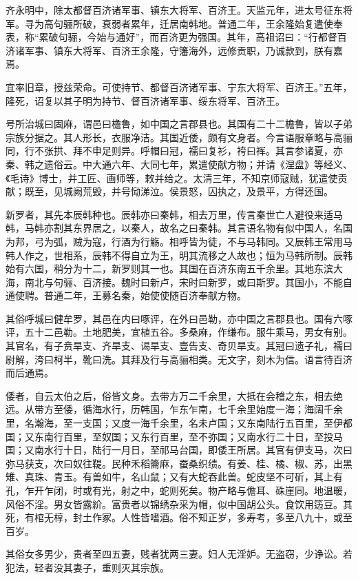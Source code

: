 \documentclass[12pt,UTF8]{ctexbook}
\begin{document}
齐永明中，除太都督百济诸军事、镇东大将军、百济王。天监元年，进太号征东将军。寻为高句骊所破，衰弱者累年，迁居南韩地。普通二年，王余隆始复遣使奉表，称“累破句骊，今始与通好”，而百济更为强国。其年，高祖诏曰：“行都督百济诸军事、镇东大将军、百济王余隆，守籓海外，远修贡职，乃诚款到，朕有嘉焉。

宜率旧章，授兹荣命。可使持节、都督百济诸军事、宁东大将军、百济王。”五年，隆死，诏复以其子明为持节、督百济诸军事、绥东将军、百济王。

号所治城曰固麻，谓邑曰檐鲁，如中国之言郡县也。其国有二十二檐鲁，皆以子弟宗族分据之。其人形长，衣服净洁。其国近倭，颇有文身者。今言语服章略与高骊同，行不张拱、拜不申足则异。呼帽曰冠，襦曰复衫，袴曰裈。其言参诸夏，亦秦、韩之遗俗云。中大通六年、大同七年，累遣使献方物；并请《涅盘》等经义、《毛诗》博士，并工匠、画师等，敕并给之。太清三年，不知京师寇贼，犹遣使贡献；既至，见城阙荒毁，并号恸涕泣。侯景怒，囚执之，及景平，方得还国。

新罗者，其先本辰韩种也。辰韩亦曰秦韩，相去万里，传言秦世亡人避役来适马韩，马韩亦割其东界居之，以秦人，故名之曰秦韩。其言语名物有似中国人，名国为邦，弓为弧，贼为寇，行酒为行觞。相呼皆为徒，不与马韩同。又辰韩王常用马韩人作之，世相系，辰韩不得自立为王，明其流移之人故也；恒为马韩所制。辰韩始有六国，稍分为十二，新罗则其一也。其国在百济东南五千余里。其地东滨大海，南北与句骊、百济接。魏时曰新卢，宋时曰新罗，或曰斯罗。其国小，不能自通使聘。普通二年，王募名秦，始使使随百济奉献方物。

其俗呼城曰健牟罗，其邑在内曰啄评，在外曰邑勒，亦中国之言郡县也。国有六啄评，五十二邑勒。土地肥美，宜植五谷。多桑麻，作缣布。服牛乘马，男女有别。其官名，有子贲旱支、齐旱支、谒旱支、壹告支、奇贝旱支。其冠曰遗子礼，襦曰尉解，洿曰柯半，靴曰洗。其拜及行与高骊相类。无文字，刻木为信。语言待百济而后通焉。

倭者，自云太伯之后，俗皆文身。去带方万二千余里，大抵在会稽之东，相去绝远。从带方至倭，循海水行，历韩国，乍东乍南，七千余里始度一海；海阔千余里，名瀚海，至一支国；又度一海千余里，名未卢国；又东南陆行五百里，至伊都国；又东南行百里，至奴国；又东行百里，至不弥国；又南水行二十日，至投马国；又南水行十日，陆行一月日，至祁马台国，即倭王所居。其官有伊支马，次曰弥马获支，次曰奴往鞮。民种禾稻籥麻，蚕桑织绩。有姜、桂、橘、椒、苏，出黑雉、真珠、青玉。有兽如牛，名山鼠；又有大蛇吞此兽。蛇皮坚不可斫，其上有孔，乍开乍闭，时或有光，射之中，蛇则死矣。物产略与儋耳、硃崖同。地温暖，风俗不淫。男女皆露紒。富贵者以锦绣杂采为帽，似中国胡公头。食饮用笾豆。其死，有棺无椁，封土作冢。人性皆嗜酒。俗不知正岁，多寿考，多至八九十，或至百岁。

其俗女多男少，贵者至四五妻，贱者犹两三妻。妇人无淫妒。无盗窃，少诤讼。若犯法，轻者没其妻子，重则灭其宗族。
\end{document}
